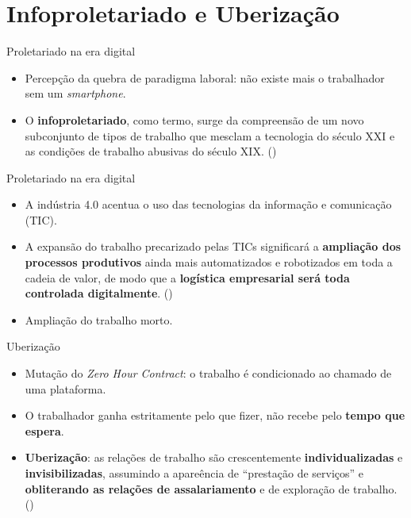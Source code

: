 \documentclass{beamer}
\begin{document}
\section{Infoproletariado e Uberização}

\begin{frame}{Proletariado na era digital}
    \begin{itemize}
        \item Percepção da quebra de paradigma laboral: não existe mais o trabalhador sem um \textit{smartphone}.
        \item O \textbf{infoproletariado}, como termo, surge da compreensão de um novo subconjunto de tipos de trabalho que mesclam a tecnologia do século XXI e as condições de trabalho abusivas do século XIX. (\cite{antunes2009})
    \end{itemize}
\end{frame}

\begin{frame}{Proletariado na era digital}
    \begin{itemize}
        \item A indústria 4.0 acentua o uso das tecnologias da informação e comunicação (TIC). 
        \item A expansão do trabalho precarizado pelas TICs significará a \textbf{ampliação dos processos produtivos} ainda mais automatizados e robotizados em toda a cadeia de valor, de modo que a \textbf{logística empresarial será toda controlada digitalmente}. (\cite{antunes2020})
        \item Ampliação do trabalho morto.
    \end{itemize}
\end{frame}

\begin{frame}{Uberização}
    \begin{itemize}
        \item Mutação do \textit{Zero Hour Contract}: o trabalho é condicionado ao chamado de uma plataforma.
        \item O trabalhador ganha estritamente pelo que fizer, não recebe pelo \textbf{tempo que espera}.
        \item \textbf{Uberização}: as relações de trabalho são crescentemente \textbf{individualizadas} e \textbf{invisibilizadas}, assumindo a apareência de ``prestação de serviços'' e \textbf{obliterando as relações de assalariamento} e de exploração de trabalho. (\cite{antunes2020})
    \end{itemize}
\end{frame}
\end{document}
